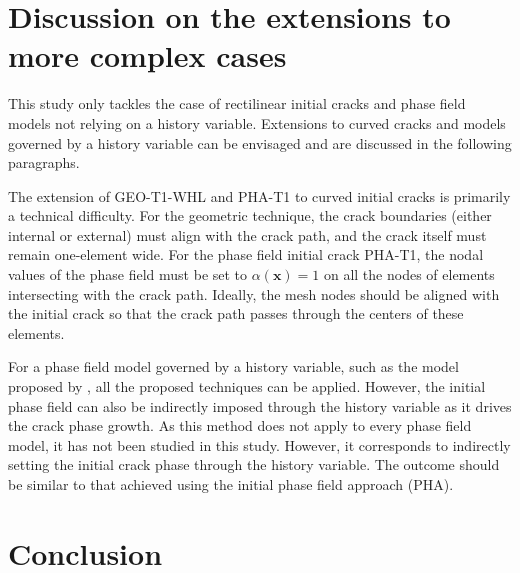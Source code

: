 \documentclass[OptSoft]{jtcam_preprint}
\newcommand{\xx}{\bm{x}}
\begin{document}
\section{Discussion on the extensions to more complex cases}
\label{sec:discussion}

This study only tackles the case of rectilinear initial cracks and phase field models not relying on a history variable.
Extensions to curved cracks and models governed by a history variable can be envisaged and are discussed in the following paragraphs.

The extension of GEO-T1-WHL and PHA-T1 to curved initial cracks is primarily a technical difficulty.
For the geometric technique, the crack boundaries (either internal or external) must align with the crack path, and the crack itself must remain one-element wide.
For the phase field initial crack PHA-T1, the nodal values of the phase field must be set to $\alpha(\xx) = 1$ on all the nodes of elements intersecting with the crack path.
Ideally, the mesh nodes should be aligned with the initial crack so that the crack path passes through the centers of these elements.

For a phase field model governed by a history variable, such as the model proposed by \textcite{miehe_phase_2010}, all the proposed techniques can be applied.
However, the initial phase field can also be indirectly imposed through the history variable as it drives the crack phase growth.
As this method does not apply to every phase field model, it has not been studied in this study.
However, it corresponds to indirectly setting the initial crack phase through the history variable.
The outcome should be similar to that achieved using the initial phase field approach (PHA).

\section{Conclusion}
\label{sec:conclusion}
\end{document}
